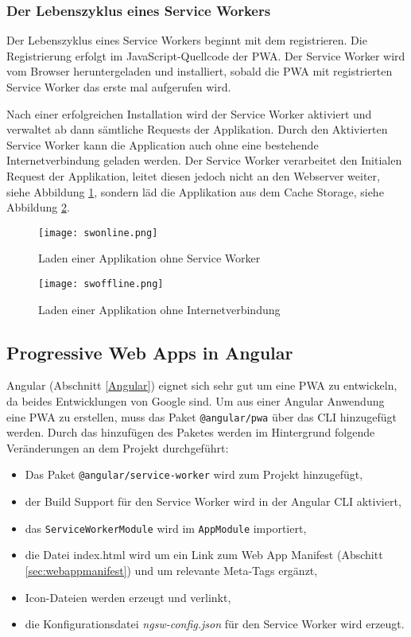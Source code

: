 \subsubsection{Der Lebenszyklus eines Service Workers}

Der Lebenszyklus eines Service Workers beginnt mit dem registrieren. Die Registrierung erfolgt im JavaScript-Quellcode der PWA. 
Der Service Worker wird vom Browser heruntergeladen und installiert, sobald die PWA mit registrierten Service Worker das erste mal aufgerufen wird. 

Nach einer erfolgreichen Installation wird der Service Worker aktiviert und verwaltet ab dann sämtliche Requests der Applikation. 
Durch den Aktivierten Service Worker kann die Application auch ohne eine bestehende Internetverbindung geladen werden. Der Service Worker verarbeitet den Initialen Request der Applikation, leitet diesen jedoch nicht an den Webserver weiter, siehe Abbildung \ref{img:swonline}, sondern läd die Applikation aus dem Cache Storage, siehe Abbildung \ref{img:swoffline}.

\begin{figure}
    \centering
    \texttt{[image: swonline.png]}
    \caption{Laden einer Applikation ohne Service Worker}
    \label{img:swonline}
\end{figure}

\begin{figure}
    \centering
    \texttt{[image: swoffline.png]}
    \caption{Laden einer Applikation ohne Internetverbindung}
    \label{img:swoffline}
\end{figure}

\subsection{Progressive Web Apps in Angular}

Angular (Abschnitt \ref{Angular}) eignet sich sehr gut um eine PWA zu entwickeln, da beides Entwicklungen von Google sind. 
Um aus einer Angular Anwendung eine PWA zu erstellen, muss das Paket \texttt{@angular/pwa} über das \ac{CLI} hinzugefügt werden.
Durch das hinzufügen des Paketes werden im Hintergrund folgende Veränderungen an dem Projekt durchgeführt: 
\begin{itemize}
    \item Das Paket \texttt{@angular/service-worker} wird zum Projekt hinzugefügt,
    \item der Build Support für den Service Worker wird in der Angular CLI aktiviert,
    \item das \texttt{ServiceWorkerModule} wird im \texttt{AppModule} importiert,
    \item die Datei index.html wird um ein Link zum Web App Manifest (Abschitt \ref{sec:webappmanifest}) und um relevante Meta-Tags ergänzt,
    \item Icon-Dateien werden erzeugt und verlinkt,
    \item die Konfigurationsdatei \textit{ngsw-config.json} für den Service Worker wird erzeugt. 
\end{itemize}

